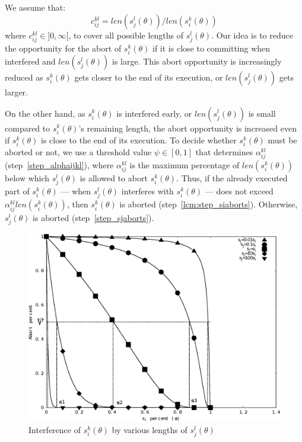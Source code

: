 \documentclass[12pt,english]{report}
\begin{document}
We assume that:
\begin{equation}
c_{ij}^{kl}=len(s_{j}^{l}(\theta))/len(s_{i}^{k}(\theta))
\label{cm_eq}\end{equation}
where $c_{ij}^{kl}\in]0,\infty[$, to cover all possible lengths of $s_{j}^{l}(\theta)$.
Our idea is to reduce the opportunity for the abort of $s_{i}^{k}(\theta)$ if it is close to committing when interfered and $len(s_{j}^{l}(\theta))$ is large. This abort opportunity is increasingly reduced as $s_{i}^{k}(\theta)$ gets closer to the end of its execution, or $len(s_{j}^{l}(\theta))$ gets larger. 

On the other hand, as $s_{i}^{k}(\theta)$ is interfered early,
or $len(s_{j}^{l}(\theta))$ is small compared to $s_{i}^{k}(\theta)$'s remaining length, the abort opportunity 
is increased even if $s_i^k (\theta)$ is close to the end of its execution. To decide whether $s_{i}^{k}(\theta)$ must be aborted or not, we use a threshold value $\psi\in[0,1]$ that determines $\alpha_{ij}^{kl}$ (step~\ref{step_alphaijkl}), where $\alpha_{ij}^{kl}$ is the maximum percentage of $len(s_i^k(\theta))$ below which $s_j^l(\theta)$ is allowed to abort $s_i^k(\theta)$. Thus, if the already executed part of $s_i^k(\theta)$ --- when $s_j^l(\theta)$ interferes with $s_i^k(\theta)$ --- does not exceed $\alpha_{ij}^{kl}len(s_i^k(\theta))$, then $s_i^k(\theta)$ is aborted (step~\ref{lcm:step_siaborts}). Otherwise, $s_j^l(\theta)$ is aborted (step~\ref{step_sjaborts}).

%
\begin{figure}[htbp]
\centering
\includegraphics[scale=0.4]{figures/figure16}
\caption{\label{fig16}Interference of $s_{i}^{k}(\theta)$ by various lengths of 
$s_{j}^{l}(\theta)$}
\end{figure}
\end{document}
